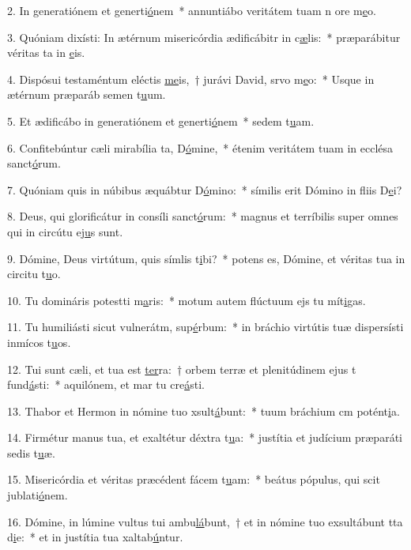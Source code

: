 2. In generatiónem et generti\uline{ó}nem~* annuntiábo veritátem tuam n ore m\uline{e}o.\par 
3. Quóniam dixísti: In ætérnum misericórdia ædificábitr in c\uline{æ}lis:~* præparábitur véritas ta in \uline{e}is.\par 
4. Dispósui testaméntum eléctis \uline{me}is,~† jurávi David, srvo m\uline{e}o:~* Usque in ætérnum præparáb semen t\uline{u}um.\par 
5. Et ædificábo in generatiónem et generti\uline{ó}nem~* sedem t\uline{u}am.\par 
6. Confitebúntur cæli mirabília ta, D\uline{ó}mine,~* étenim veritátem tuam in ecclésa sanct\uline{ó}rum.\par 
7. Quóniam quis in núbibus æquábtur D\uline{ó}mino:~* símilis erit Dómino in fliis D\uline{e}i?\par 
8. Deus, qui glorificátur in consíli sanct\uline{ó}rum:~* magnus et terríbilis super omnes qui in circútu ej\uline{u}s sunt.\par 
9. Dómine, Deus virtútum, quis símlis t\uline{i}bi?~* potens es, Dómine, et véritas tua in circitu t\uline{u}o.\par 
10. Tu domináris potestti m\uline{a}ris:~* motum autem flúctuum ejs tu mít\uline{i}gas.\par 
11. Tu humiliásti sicut vulnerátm, sup\uline{é}rbum:~* in bráchio virtútis tuæ dispersísti inmícos t\uline{u}os.\par 
12. Tui sunt cæli, et tua est \uline{ter}ra:~† orbem terræ et plenitúdinem ejus t fund\uline{á}sti:~* aquilónem, et mar tu cre\uline{á}sti.\par 
13. Thabor et Hermon in nómine tuo xsult\uline{á}bunt:~* tuum bráchium cm potént\uline{i}a.\par 
14. Firmétur manus tua, et exaltétur déxtra t\uline{u}a:~* justítia et judícium præparáti sedis t\uline{u}æ.\par 
15. Misericórdia et véritas præcédent fácem t\uline{u}am:~* beátus pópulus, qui scit jublati\uline{ó}nem.\par 
16. Dómine, in lúmine vultus tui ambu\uline{lá}bunt,~† et in nómine tuo exsultábunt tta d\uline{i}e:~* et in justítia tua xaltab\uline{ú}ntur.\par 
